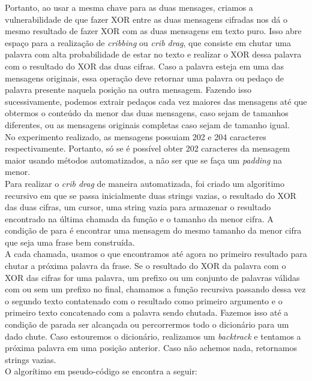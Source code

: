 \documentclass[10pt]{article}
\begin{document}
        Portanto, ao usar a mesma chave para as duas mensages, criamos a vulnerabilidade de que fazer XOR entre as duas 
        mensagens cifradas nos dá o mesmo resultado de fazer XOR com as duas mensagens em texto puro. Isso abre espaço 
        para a realização de \textit{cribbing} ou \textit{crib drag}, que consiste em chutar uma palavra com alta probabilidade
        de estar no texto e realizar o XOR dessa palavra com o resultado do XOR das duas cifras. Caso a palavra esteja em uma
        das mensagens originais, essa operação deve retornar uma palavra ou pedaço de palavra presente naquela posição na
        outra mensagem. Fazendo isso sucessivamente, podemos extrair pedaços cada vez maiores das mensagens até que obtermos
        o conteúdo da menor das duas mensagens, caso sejam de tamanhos diferentes, ou as mensagens originais completas caso
        sejam de tamanho igual. \\

        No experimento realizado, as mensagens possuiam 202 e 204 caracteres respectivamente. Portanto, só se é possível
        obter 202 caracteres da mensagem maior usando métodos automatizados, a não ser que se faça um \textit{padding} na
        menor. \\

        Para realizar o \textit{crib drag} de maneira automatizada, foi criado um algoritimo recursivo em que se passa inicialmente duas strings vazias, o resultado do XOR das duas cifras, um cursor, uma string vazia para armazenar o resultado encontrado na última chamada da função e o tamanho da menor cifra. A condição de para é encontrar uma mensagem do mesmo tamanho da menor cifra que seja uma frase bem construída. \\

        A cada chamada, usamos o que encontramos até agora no primeiro resultado para chutar a próxima palavra da frase. Se o resultado do XOR da palavra com o XOR das cifras for uma palavra, um prefixo ou um conjunto de palavras válidas com ou sem um prefixo no final, chamamos a função recursiva passando dessa vez o segundo texto contatenado com o resultado como primeiro argumento e o primeiro texto concatenado com a palavra sendo chutada. Fazemos isso até a condição de parada ser alcançada ou percorrermos todo o dicionário para um dado chute. Caso estouremos o dicionário, realizamos um \textit{backtrack} e tentamos a próxima palavra em uma posição anterior. Caso não achemos nada, retornamos strings vazias. \\
        \newpage
        O algorítimo em pseudo-código se encontra a seguir:
\end{document}
